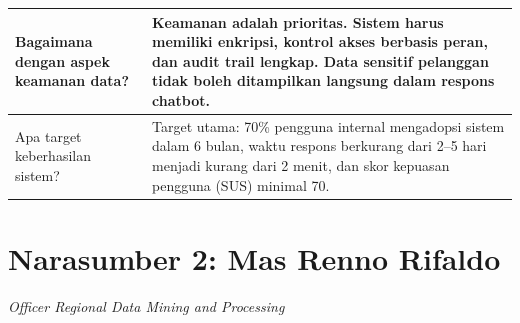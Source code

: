 \begin{longtable}{|p{4.5cm}|p{7.5cm}|}
Bagaimana dengan aspek keamanan data? & Keamanan adalah prioritas. Sistem harus memiliki enkripsi, kontrol akses berbasis peran, dan audit trail lengkap. Data sensitif pelanggan tidak boleh ditampilkan langsung dalam respons chatbot. \\
\hline

Apa target keberhasilan sistem? & Target utama: 70\% pengguna internal mengadopsi sistem dalam 6 bulan, waktu respons berkurang dari 2--5 hari menjadi kurang dari 2 menit, dan skor kepuasan pengguna (SUS) minimal 70. \\
\hline

\end{longtable}

\section*{Narasumber 2: Mas Renno Rifaldo}
\textit{Officer Regional Data Mining and Processing}

